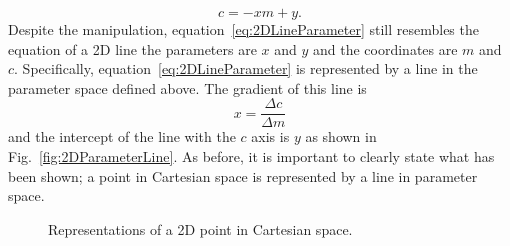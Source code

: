 \begin{equation}
  c = -xm + y.
  \label{eq:2DLineParameter}
\end{equation}
Despite the manipulation, equation~\ref{eq:2DLineParameter} still resembles the equation of a 2D line the parameters are $x$ and $y$ and the coordinates are $m$ and $c$.  Specifically, equation~\ref{eq:2DLineParameter} is represented by a line in the parameter space defined above.  The gradient of this line is 
\begin{equation}
  x = \frac{\Delta c}{\Delta m}
  \label{eq:2DLineGradientParameterSpace}
\end{equation}
and the intercept of the line with the $c$ axis is $y$ as shown in Fig.~\ref{fig:2DParameterLine}.  As before, it is important to clearly state what has been shown; a point in Cartesian space is represented by a line in parameter space.
\begin{figure}%
  \centering
  \hspace{1em}
  \caption{Representations of a 2D point in Cartesian space.}
  \label{fig:2DCartesianPointAndParameterLine}
\end{figure}


